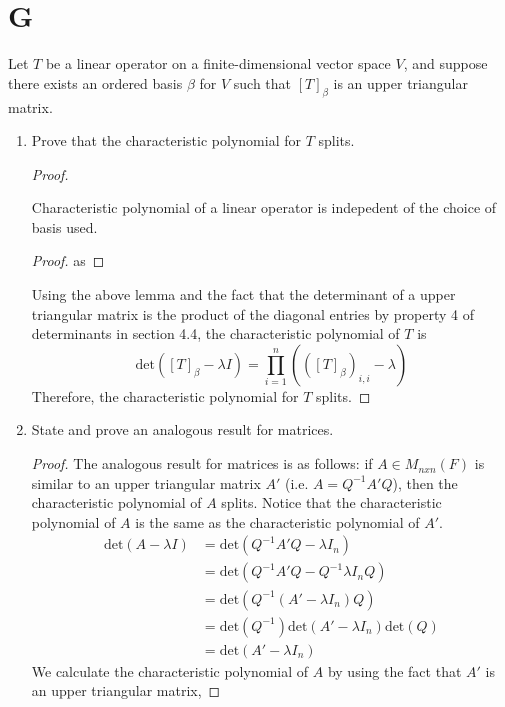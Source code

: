 \documentclass[11pt]{scrartcl}
\begin{document}
\section{G}
Let $T$ be a linear operator on a finite-dimensional vector space $V$, and suppose there exists an ordered basis $\beta$ for
$V$ such that $[T]_\beta$ is an upper triangular matrix.
\begin{enumerate}[label=\alph*.]
	\item{
	      Prove that the characteristic polynomial for $T$ splits.
	      \begin{proof}
		      \begin{lemma}
			      Characteristic polynomial of a linear operator is indepedent of the choice of basis used.
			      \begin{proof}
				      as
			      \end{proof}
		      \end{lemma}
		      Using the above lemma and the fact that the determinant of a upper triangular matrix is the product of
		      the diagonal entries by property 4 of determinants in section 4.4, the characteristic polynomial of $T$ is
		      \[
			      \text{det}([T]_\beta - \lambda I) = \prod_{i=1}^{n}(([T]_\beta)_{i,i} - \lambda)
		      \]
		      Therefore, the characteristic polynomial for $T$ splits.
	      \end{proof}
	      }
	\item{
	      State and prove an analogous result for matrices.
	      \begin{proof}
			  The analogous result for matrices is as follows: if $A \in M_{nxn}(F)$ is similar to an upper triangular matrix $A'$ 
			  (i.e. $A=Q^{-1}A'Q$),
			  then the characteristic polynomial of $A$ splits. 
			  Notice that the characteristic polynomial of $A$ is the same as the characteristic polynomial of $A'$.
		      \begin{align*}
			      \text{det}(A - \lambda I) & = \text{det}(Q^{-1}A'Q - \lambda I_n) \\
											& = \text{det}(Q^{-1}A'Q - Q^{-1}\lambda I_nQ) \\
											& = \text{det}(Q^{-1}(A' - \lambda I_n)Q) \\
											& = \text{det}(Q^{-1}) \text{det}(A' - \lambda I_n)\text{det}(Q)\\
											& = \text{det}(A' - \lambda I_n)
		      \end{align*}
			  We calculate the characteristic polynomial of $A$ by using the fact that $A'$ is an upper triangular matrix,

\end{proof}}
\end{enumerate}
\end{document}
